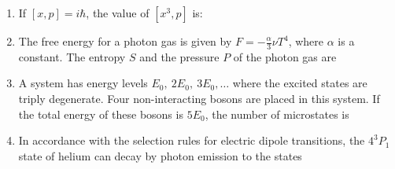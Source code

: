 \documentclass[journal,13pt,onecolumn]{IEEEtran}
\begin{document}
\begin{enumerate}[itemsep = 1em]
\item If $[x, p] = i \hbar$, the value of $[x^{3}, p]$ is:

\hfill{}

\begin{enumerate}
\end{enumerate}

\item The free energy for a photon gas is given by $F = -\frac{\alpha}{3} \nu T^{4}$, where $\alpha$ is a constant. The entropy $S$ and the pressure $P$ of the photon gas are

\hfill{}
\begin{enumerate}
\end{enumerate}

\item A system has energy levels $E_{0}, \ 2E_{0}, \ 3E_{0}, \dots$ where the excited states are triply degenerate. Four non-interacting bosons are placed in this system. If the total energy of these bosons is $5E_{0}$, the number of microstates is

\hfill{}
\begin{enumerate}
\end{enumerate}

\item In accordance with the selection rules for electric dipole transitions, the $4^{3}P_{1}$ state of helium can decay by photon emission to the states


\end{enumerate}
\end{document}
